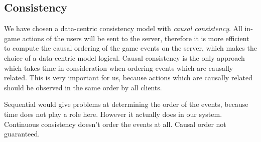 \documentclass{article}
\begin{document}
\subsection{Consistency}
We have chosen a data-centric consistency model with \emph{causal consistency}.  All in-game actions of the users will be sent to the server, therefore it is more efficient to compute the causal ordering of the game events on the server, which makes the choice of a data-centric model logical.  Causal consistency is the only approach which takes time in consideration when ordering events which are causally related. This is very important for us, because actions which are causally related should be observed in the same order by all clients. 

Sequential would give problems at determining the order of the events, because time does not play a role here. However it actually does in our system. Continuous consistency doesn't order the events at all. Causal order not guaranteed.

\iffalse
\begin{itemize}
	\item The game will be server centric and not peer-to-peer.
	\item All in-game actions of the users will be sent to the server, therefore it is more efficient to compute the causal ordering of the game events on the server. 
	\item In this way the server is able to sent the ordered events to all clients. However in a peer-to-peer system, all the actions would have to be sent to all the different clients and each client would have had to compute the correct ordering of the events. 
	\item By letting the server process the incoming data of all the different clients, we take away some workload from the clients.
	\item This might even lead to inconsistency between clients as they don't know each others result. As these results might differ per client the requirement of having at least 2 redundant copies of the game log might be impossible as it is not possible to verify which client has the righteous data.
\end{itemize} 

causal consistency:
\begin{itemize}
	\item a logical choice when taking the causal actions, described by the requirements, into consideration.
	\item Sequential would give problems at determining the order of the events. Time does not play a role here. However it actually does in our system
	\item Continuous consistency doesn't order the events at all. Causal order not guaranteed.
\end{itemize}
\newpage
\fi


\newpage
\nocite{*}


\end{document}
